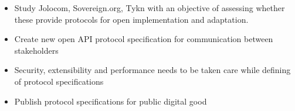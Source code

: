 \begin{itemize}
    \item Study Jolocom, Sovereign.org, Tykn with an objective of assessing whether these provide protocols for open implementation and adaptation. 
    \item Create new open API protocol specification for communication between stakeholders 
    \item Security, extensibility and performance needs to be taken care while defining of protocol specifications
    \item Publish protocol specifications for public digital good
\end{itemize}
